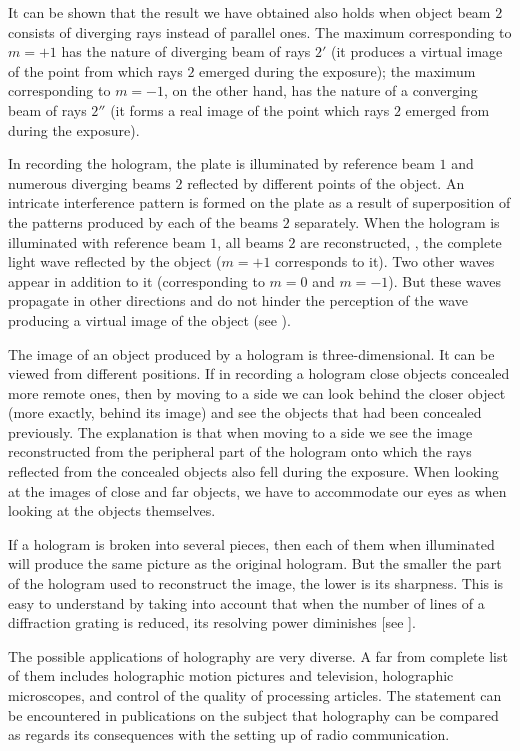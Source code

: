 It can be shown that the result we have obtained also holds when object beam $2$ consists of diverging rays instead of parallel ones.
The maximum corresponding to $m = +1$ has the nature of diverging beam of rays $2'$ (it produces a virtual image of the point from which
rays $2$ emerged during the exposure); the maximum corresponding to $m = -1$, on the other hand, has the nature of a converging beam of rays $2''$ (it forms a real image of the point which rays $2$ emerged from during the exposure).

In recording the hologram, the plate is illuminated by reference beam $1$ and numerous diverging beams $2$ reflected by different points of the object.
An intricate interference pattern is formed on the plate as a result of superposition of the patterns produced by each of the beams $2$ separately.
When the hologram is illuminated with reference beam $1$, all beams $2$ are reconstructed, \ie, the complete light wave reflected by the object ($m = +1$ corresponds to it).
Two other waves appear in addition to it (corresponding to $m = 0$ and $m = -1$).
But these waves propagate in other directions and do not hinder the perception of the wave producing a virtual image of the object (see ).

The image of an object produced by a hologram is three-dimensional.
It can be viewed from different positions.
If in recording a hologram close objects concealed more remote ones, then by moving to a side we can look behind the closer object (more exactly, behind its image) and see the objects that had been concealed previously.
The explanation is that when moving to a side we see the image reconstructed from the peripheral part of the hologram onto which the rays reflected from the concealed objects also fell during the exposure.
When looking at the images of close and far objects, we have to accommodate our eyes as when looking at the objects themselves.

If a hologram is broken into several pieces, then each of them when illuminated will produce the same picture as the original hologram.
But the smaller the part of the hologram used to reconstruct the image, the lower is its sharpness.
This is easy to understand by taking into account that when the number of lines of a diffraction grating is reduced, its resolving power diminishes [see ].

The possible applications of holography are very diverse.
A far from complete list of them includes holographic motion pictures and television, holographic microscopes, and control of the quality of processing articles.
The statement can be encountered in publications on the subject that holography can be compared as regards its consequences with the setting up of radio communication.
